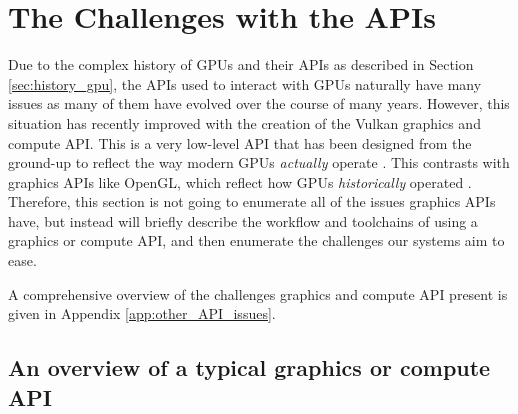 \documentclass[a4paper,12pt,twoside,openright]{report}
\begin{document}
\section{The Challenges with the APIs}

\label{sec:api_challanges}



Due to the complex history of GPUs and their APIs as described in Section
\ref{sec:history_gpu}, the APIs used to interact with GPUs naturally have many
issues as many of them have evolved over the course of many years. However,
this situation has recently improved with the creation of the Vulkan graphics
and compute API. This is a very low-level API that has been designed from the
ground-up to reflect the way modern GPUs \textit{actually} operate
\cite{Vulkan}. This contrasts with graphics APIs like OpenGL, which reflect how
GPUs \textit{historically} operated \cite{TODO}. Therefore, this section is not
going to enumerate all of the issues graphics APIs have, but instead will
briefly describe the workflow and toolchains of using a graphics or compute
API, and then enumerate the challenges our systems aim to ease.

A comprehensive overview of the challenges graphics and compute API present is
given in Appendix \ref{app:other_API_issues}.

\subsection{An overview of a typical graphics or compute API}

\end{document}
